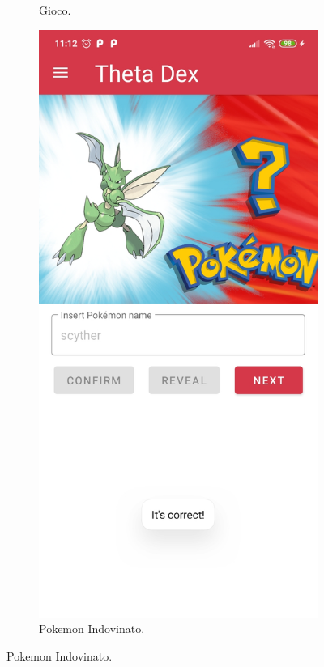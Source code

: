 \documentclass[a4paper,11pt]{article}
\begin{document}
\begin{figure}[h!]
{\begin{subfigure}[b]{0.4\linewidth}
    \caption{Gioco.}
  \end{subfigure}
  \begin{subfigure}[b]{0.4\linewidth}
    \includegraphics[width=\linewidth]{who_correct.jpg}
    \caption{Pokemon Indovinato.}
  \end{subfigure}
  }
\end{figure}
\newpage
\end{document}
